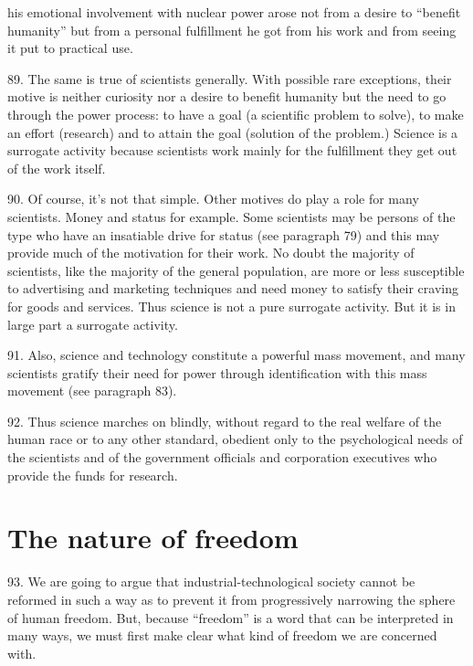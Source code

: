 \documentclass{article}
\begin{document}
his emotional involvement with nuclear power arose not from a desire to “benefit humanity” but 
from a personal fulfillment he got from his work and from seeing it put to practical use. \vspace{\baselineskip} \newpage

89.  The same is true of scientists generally.  With possible rare exceptions, their motive is neither 
curiosity nor a desire to benefit humanity but the need to go through the power process: to have a 
goal (a scientific problem to solve), to make an effort (research) and to attain the goal (solution of 
the problem.) Science is a surrogate activity because scientists work mainly for the fulfillment they 
get out of the work itself. \vspace{\baselineskip}

90.  Of course, it’s not that simple.  Other motives do play a role for many scientists.  Money and 
status for example.  Some scientists may be persons of the type who have an insatiable drive for 
status (see paragraph 79) and this may provide much of the motivation for their work.  No doubt 
the majority of scientists, like the majority of the general population, are more or less susceptible 
to  advertising  and  marketing  techniques  and  need  money  to  satisfy  their  craving  for  goods  and  
services.  Thus science is not a pure surrogate activity.  But it is in large part a surrogate activity. \vspace{\baselineskip}

91.  Also,  science  and  technology  constitute  a  powerful  mass  movement,  and  many  scientists  
gratify their need for power through identification with this mass movement (see paragraph 83). \vspace{\baselineskip}

92.  Thus science marches on blindly, without regard to the real welfare of the human race or to 
any other standard, obedient only to the psychological needs of the scientists and of the government 
officials and corporation executives who provide the funds for research. 


\section{The nature of freedom}

\hspace{0.5cm} 93.  We are going to argue that industrial-technological society cannot be reformed in such a way 
as  to  prevent  it  from  progressively  narrowing  the  sphere  of  human  freedom.   But,  because  
“freedom” is a word that can be interpreted in many ways, we must first make clear what kind of 
freedom we are concerned with. \vspace{\baselineskip}
\end{document}
